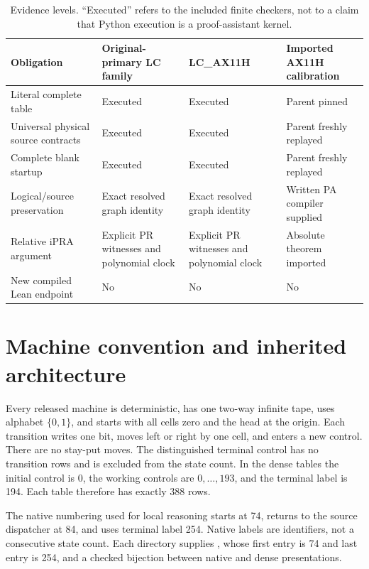 \documentclass[11pt,a4paper]{article}
\begin{document}
\begin{table}[ht]
\centering\small
\begin{tabularx}{\textwidth}{@{}p{}XXX@{}}
\toprule
Obligation & Original-primary LC family & LC\_AX11H & Imported AX11H calibration\\
\midrule
Literal complete table & Executed & Executed & Parent pinned\\
Universal physical source contracts & Executed & Executed & Parent freshly replayed\\
Complete blank startup & Executed & Executed & Parent freshly replayed\\
Logical/source preservation & Exact resolved graph identity & Exact resolved graph identity & Written PA compiler supplied\\
Relative iPRA argument & Explicit PR witnesses and polynomial clock & Explicit PR witnesses and polynomial clock & Absolute theorem imported\\
New compiled Lean endpoint & No & No & No\\
\bottomrule
\end{tabularx}
\caption{Evidence levels. ``Executed'' refers to the included finite checkers, not to a claim that Python execution is a proof-assistant kernel.}
\end{table}

\section{Machine convention and inherited architecture}

Every released machine is deterministic, has one two-way infinite tape,
uses alphabet $\{0,1\}$, and starts with all cells zero and the head at the
origin. Each transition writes one bit, moves left or right by one cell,
and enters a new control. There are no stay-put moves. The distinguished
terminal control has no transition rows and is excluded from the state
count. In the dense tables the initial control is 0, the working controls
are $0,\ldots,193$, and the terminal label is 194. Each table therefore
has exactly 388 rows.

The native numbering used for local reasoning starts at 74, returns to
the source dispatcher at 84, and uses terminal label 254. Native labels
are identifiers, not a consecutive state count. Each directory supplies
, whose first entry is 74 and last entry is 254, and a
checked bijection between native and dense presentations.
\end{document}
